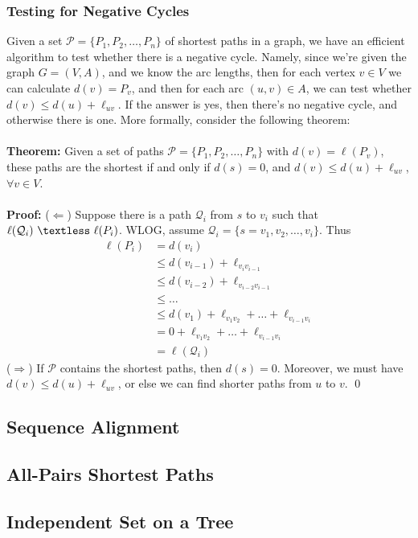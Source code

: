 \documentclass{article}
\newcommand{\lt}{\textless}
\newcommand{\imply}{\Rightarrow}
\newcommand{\limply}{\Leftarrow}
\newcommand{\thm}{\textbf{Theorem: }}
\newcommand{\proo}{\textbf{Proof: }}
\newcommand{\mcal}[1]{\mathcal{#1}}
\begin{document}
\subsubsection{Testing for Negative Cycles}
Given a set $\mcal{P} = \{P_1, P_2, \dots, P_n\}$ of shortest paths in a graph, we have an efficient algorithm to test whether there is a negative cycle. Namely, since we're given the graph $G = (V, A)$, and we know the arc lengths, then for each vertex $v \in V$ we can calculate $d(v) = P_v$, and then for each arc $(u, v) \in A$, we can test whether $d(v) \leq d(u) + \ell_{uv}$. If the answer is yes, then there's no negative cycle, and otherwise there is one. More formally, consider the following theorem:\\\\
\thm Given a set of paths $\mcal{P} = \{P_1, P_2, \dots, P_n\}$ with $d(v) = \ell(P_v)$, these paths are the shortest if and only if $d(s) = 0$, and $d(v) \leq d(u) + \ell_{uv}$, $\forall v \in V.$\\\\
\proo ($\limply$) Suppose there is a path $\mcal{Q}_i$ from $s$ to $v_i$ such that $\ell(\mcal{Q}_i)\ \lt\ \ell(P_i)$. WLOG, assume $\mcal{Q}_i = \{s=v_1, v_2, \dots, v_i\}$. Thus
\begin{align*}
	\ell(P_i) &= d(v_i)\\
			&\leq d(v_{i-1}) + \ell_{v_iv_{i-1}}\\
			&\leq d(v_{i-2}) + \ell_{v_{i-2}v_{i-1}}\\
			&\leq \dots\\
			&\leq d(v_1) + \ell_{v_1v_2} + \dots + \ell_{v_{i-1}v_i}\\
			&= 0 + \ell_{v_1v_2} + \dots + \ell_{v_{i-1}v_i}\\
			&= \ell(\mcal{Q}_i)
\end{align*}
($\imply$) If $\mcal{P}$ contains the shortest paths, then $d(s) = 0$. Moreover, we must have $d(v) \leq d(u) + \ell_{uv}$, or else we can find shorter paths from $u$ to $v$.
\qed
\subsection{Sequence Alignment}
\subsection{All-Pairs Shortest Paths}
\subsection{Independent Set on a Tree}
\newpage
\end{document}

